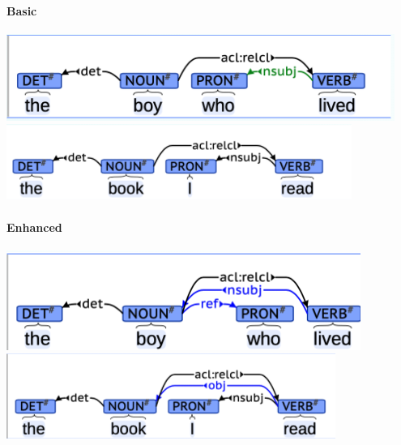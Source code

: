 \documentclass[10pt]{report}
\begin{document}
\begin{multicols}{2}
\paragraph{Basic}
\begin{center}
	\includegraphics[scale=0.5]{57.png}\\
	\includegraphics[scale=0.5]{58.png}
\end{center}
\paragraph{Enhanced}
\begin{center}
	\includegraphics[scale=0.5]{59.png}\\
	\includegraphics[scale=0.5]{60.png}
\end{center}
\end{multicols}
\end{document}
